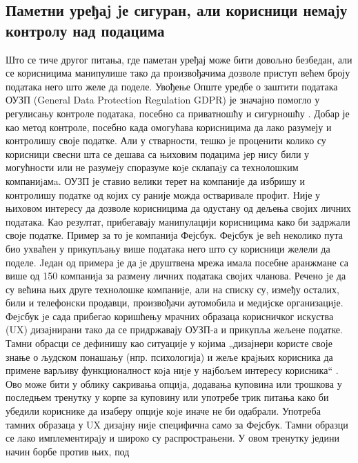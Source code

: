 \documentclass[a4paper]{article}
\begin{document}
\subsection{Паметни уређаj jе сигуран, али корисници немаjу контролу над подацима}
Што се тиче другог питања, где паметан уређај може бити довољно безбедан, али се корисницима манипулише тако да произвођачима дозволе приступ
већем броју података него што желе да поделе. Увођење Опште уредбе о заштити података ОУЗП (General Data Protection Regulation GDPR)  је значајно помогло у регулисању контроле података,
посебно са приватношћу и сигурношћу \cite{4}. Добар је као метод контроле, посебно када омогућава корисницима да лако разумеју и контролишу своје податке.
Али у стварности, тешко је проценити колико су корисници свесни шта се дешава са њиховим подацима jер нису били у могућности или не разумеjу споразуме
коjе склапаjу са технолошким компаниjамa. ОУЗП је ставио велики терет на компаније да избришу и контролишу податке од којих су раније можда остваривале профит.
Није у њиховом интересу да дозволе корисницима да одустану од дељења својих личних података. Као резултат, прибегавају манипулацији корисницима како
би задржали своје податке.
\newline  \newline
Пример за то је компанија Фејсбук. Феjсбук jе већ неколико пута био ухваћен у прикупљању више података него што су корисници желели да поделе. Jедан од примера
jе да jе друштвена мрежа имала посебне аранжмане са више од 150 компаниjа за размену личних података своjих чланова. Речено jе да су већина њих друге технолошке компаниjе, 
али на списку су, између осталих, били и телефонски продавци, произвођачи аутомобила и медиjске организациjе. Феjсбук jе сада прибегао коришћењу
мрачних образаца корисничког искуства (UX) дизаjнирани тако да се придржавају ОУЗП-а и прикупља жељене податке. Тамни обрасци се дефинишу као ситуације у којима
„дизајнери користе своје знање о људском понашању (нпр. психологија) и жеље краjњих корисника да примене варљиву функционалност коjа ниjе у наjбољем интересу корисника“ \cite{5}.
Ово може бити у облику сакривања опциjа, додавања куповина или трошкова у последњем тренутку у корпе за куповину или употребе трик питања како би убедили кориснике да изаберу опциjе коjе иначе не би одабрали.
\newline  \newline
Употреба тамних образаца у UX дизаjну ниjе специфична само за Феjсбук. Тамни образци се лако имплементираjу и широко су распрострањени. У овом тренутку jедини начин борбе против њих, под
\end{document}
